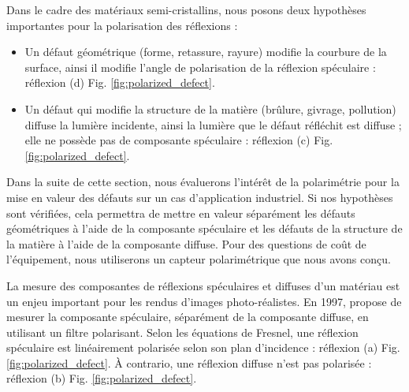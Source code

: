 Dans le cadre des matériaux semi-cristallins, nous posons deux hypothèses importantes pour la polarisation des réflexions :
\begin{itemize}
	\item Un défaut géométrique (forme, retassure, rayure)  modifie la courbure de la surface, ainsi il modifie l'angle de polarisation de la réflexion spéculaire : réflexion (d) Fig. \ref{fig:polarized_defect}.
	\item Un défaut qui modifie la structure de la matière (brûlure, givrage, pollution) diffuse la lumière incidente, ainsi la lumière que le défaut réfléchit est diffuse ; elle ne possède pas de composante spéculaire : réflexion (c) Fig. \ref{fig:polarized_defect}.
\end{itemize}
Dans la suite de cette section, nous évaluerons l'intérêt de la polarimétrie pour la mise en valeur des défauts sur un cas d'application industriel.
Si nos hypothèses sont vérifiées, cela permettra de mettre en valeur séparément les défauts géométriques à l'aide de la composante spéculaire et les défauts de la structure de la matière à l'aide de la composante diffuse.
Pour des questions de coût de l'équipement, nous utiliserons un capteur polarimétrique que nous avons conçu.


La mesure des composantes de réflexions spéculaires et diffuses d'un matériau est un enjeu important pour les rendus d'images photo-réalistes.
En 1997, \citeauthor{nayar_separation_1997} \cite{nayar_separation_1997} propose de mesurer la composante spéculaire, séparément de la composante diffuse, en utilisant un filtre polarisant.
Selon les équations de Fresnel, une réflexion spéculaire est linéairement polarisée selon son plan d'incidence : réflexion (a) Fig. \ref{fig:polarized_defect}.
À contrario, une réflexion diffuse n'est pas polarisée : réflexion (b) Fig. \ref{fig:polarized_defect}.

